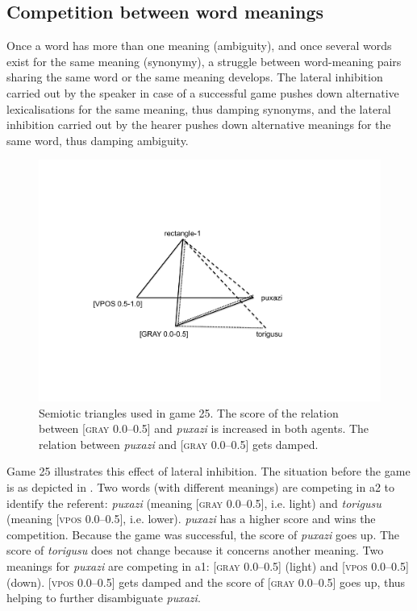 \subsection{Competition between word meanings }

Once a word has more than one meaning (ambiguity), 
and once several words exist for the same meaning 
(synonymy), a struggle between word-meaning
pairs sharing the same word or the 
same meaning develops. The lateral inhibition carried out by the 
speaker in case of a successful game pushes
down alternative lexicalisations for the same meaning, 
thus damping synonyms, and the lateral inhibition carried out 
by the hearer pushes down alternative meanings for the 
same word, thus damping ambiguity. 


\begin{figure}[t]
  \centerline{\includegraphics[width=.60\textwidth]{chap6/figs/triangle5.pdf}}
\caption{\label{triangle5}Semiotic triangles used 
in game 25. The score of the relation between [\textsc{gray} 0.0–0.5] and 
\textit{puxazi} is increased in both agents. The relation between \textit{puxazi} and 
{}[\textsc{gray} 0.0–0.5] gets damped.}
\end{figure}

Game 25 illustrates this effect of 
lateral inhibition. The situation before the game is 
as depicted in . 
Two words (with different meanings) are competing in {\bfshape  a2} to 
identify the referent: \textit{puxazi} (meaning 
{}[\textsc{gray} 0.0–0.5], i.e. light) and \textit{torigusu}
(meaning [\textsc{vpos} 0.0–0.5], i.e. lower).  \textit{puxazi} has
a higher score and wins the competition. Because the game 
was successful, the score
of \textit{puxazi} goes up. The score of \textit{torigusu} 
does not change because it concerns another 
meaning. Two meanings for \textit{puxazi}
are competing in {\bfshape  a1}: [\textsc{gray} 0.0–0.5] (light)
and [\textsc{vpos} 0.0–0.5] (down). [\textsc{vpos} 0.0–0.5] gets damped and 
the score of [\textsc{gray} 0.0–0.5] goes up, thus helping to 
further disambiguate \textit{puxazi}. 

